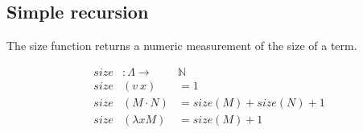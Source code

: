 \documentclass{entcs}
\begin{document}
\begin{code}
\> \AgdaSymbol{:}    \AgdaSymbol{(}  \AgdaSymbol{)}\<%
\\
\> \AgdaSymbol{=}  \<[14]%
\>[14]\AgdaSymbol{(} \AgdaSymbol{(}  \AgdaSymbol{))} \<[33]%
\>[33]\<%
\\
\>[13]\<[14]%
\>[14] \AgdaBound{\_}  \AgdaSymbol{)}  \AgdaBound{\_} \AgdaBound{\_} \AgdaBound{\_} \AgdaBound{\_}  \AgdaSymbol{)} \<[52]%
\>[52]\<%
\\
\>[13]\<[14]%
\>[14]\AgdaSymbol{(}\AgdaInductiveConstructor{[]} \AgdaInductiveConstructor{,}   \AgdaBound{\_}    \AgdaSymbol{(} \AgdaInductiveConstructor{,} \AgdaSymbol{))}\<%
\end{code}


\subsection{Simple recursion}
\label{sec:rec}

The size function returns a numeric measurement of the size of a term.


\begin{minipage}{.9\textwidth}
\[
\begin{array}{rll}
size &: \Lambda \rightarrow& \mathbb{N} \\
size &(v\ x)         &= 1 \\
size &(M \cdot N)   &= size (M) + size (N) + 1 \\
size &(\lambda x M) &= size (M) + 1 
\end{array} \]
\end{minipage}


\begin{code}%
\> \AgdaSymbol{:}   \<%
\\
\> \AgdaSymbol{=}   \AgdaSymbol{(} \AgdaSymbol{)}       \AgdaPrimitive{+} \AgdaSymbol{)} \AgdaSymbol{(} \AgdaInductiveConstructor{[]} \AgdaInductiveConstructor{,}  \AgdaBound{\_}    \AgdaSymbol{)}\<%
\end{code}
\end{document}
